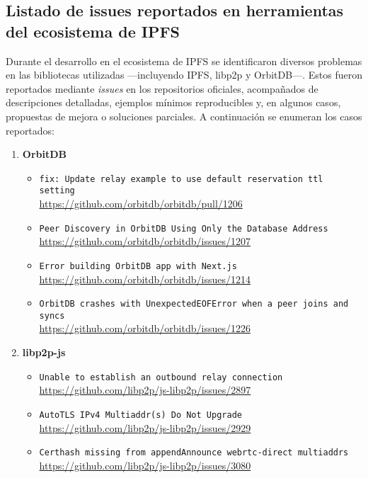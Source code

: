 \subsection{Listado de issues reportados en herramientas del ecosistema de IPFS}
\label{anexo:issues-ipfs}

Durante el desarrollo en el ecosistema de IPFS se identificaron diversos problemas en las bibliotecas utilizadas —incluyendo IPFS, libp2p y OrbitDB—. Estos fueron reportados mediante \textit{issues} en los repositorios oficiales, acompañados de descripciones detalladas, ejemplos mínimos reproducibles y, en algunos casos, propuestas de mejora o soluciones parciales. A continuación se enumeran los casos reportados:

\begin{enumerate}
    \item \textbf{OrbitDB}
    \begin{itemize}
        \item \texttt{fix: Update relay example to use default reservation ttl setting}\\
        \url{https://github.com/orbitdb/orbitdb/pull/1206}
        \item \texttt{Peer Discovery in OrbitDB Using Only the Database Address}\\
        \url{https://github.com/orbitdb/orbitdb/issues/1207}
        \item \texttt{Error building OrbitDB app with Next.js}\\
        \url{https://github.com/orbitdb/orbitdb/issues/1214}
        \item \texttt{OrbitDB crashes with UnexpectedEOFError when a peer joins and syncs}\\
        \url{https://github.com/orbitdb/orbitdb/issues/1226}
    \end{itemize}

    \item \textbf{libp2p-js}
    \begin{itemize}
        \item \texttt{Unable to establish an outbound relay connection}\\
        \url{https://github.com/libp2p/js-libp2p/issues/2897}
        \item \texttt{AutoTLS IPv4 Multiaddr(s) Do Not Upgrade}\\
        \url{https://github.com/libp2p/js-libp2p/issues/2929}
        \item \texttt{Certhash missing from appendAnnounce webrtc-direct multiaddrs}\\
        \url{https://github.com/libp2p/js-libp2p/issues/3080}
    \end{itemize}
\end{enumerate}
